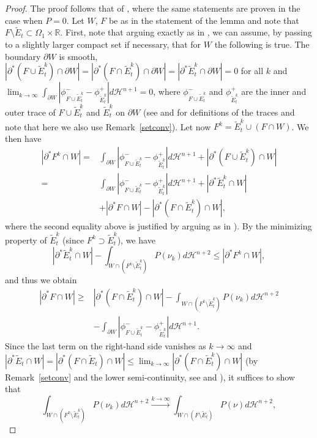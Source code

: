 \documentclass[11pt]{amsart}
\def\R{\mathbb{R}}
\def\H{\mathcal{H}}
\def\wt{\widetilde}
\begin{document}
\begin{proof} The proof follows that of \cite[Lemma 5.6, Corollary 5.7]{S08}, where the same statements are proven in the case when $P=0$. Let $W$, $F$ be as in the statement of the lemma and note that $F\setminus\wt E_t\subset\Omega_1\times\R$. First, note that arguing exactly as in \cite[Lemma 5.6]{S08}, we can assume, by passing to a slightly larger compact set if necessary, that for $W$  the following is true. The boundary  $\partial W$ is smooth, 
$|\partial^*(F\cup \wt E_t^k)\cap\partial W|=|\partial^*(F\cap \wt E_t^k)\cap\partial W|=|\partial^* \wt E_t^k\cap\partial W|=0$ for all $k$
 and $\lim_{k\to\infty}\int_{\partial W} |\phi^-_{F\cup \wt E_t^k}-\phi^+_{\wt E_t^k}|d\H^{n+1}= 0$,
where $\phi^-_{F\cup \wt E_t^k}$ and $\phi^+_{\wt E_t^k}$
are the inner and outer trace of ${F\cup \wt E_t^k}$ and  $\wt E_t^k$ on $\partial W$ (see \cite[Chapter 2]{Giu} and \cite[Section 2.4]{Alex} for definitions of the traces and note that here we also use Remark~\ref{setconv}). Let now $F^k= \wt E_t^k\cup (F\cap W)$. We  then have
\[\begin{split}|\partial^*F^k\cap W|=&\int_{\partial W} |\phi^-_{F\cup \wt E_t^k}-\phi^+_{\wt E_t^k}|d\H^{n+1}+|\partial^*(F\cup \wt E_t^k)\cap W|\\
=&\int_{\partial W} |\phi^-_{F\cup \wt E_t^k}-\phi^+_{\wt E_t^k}|d\H^{n+1}+ |\partial^* \wt E^k_t\cap W|\\
&+ |\partial^* F\cap W|-|\partial^*(F\cap \wt E_t^k)\cap W|,
\end{split}\]
where the second equality above is justified by  arguing as in \cite[(36) of proof Lemma~5.6]{S08}).
By the minimizing property of  $\wt E_t^k$ (since $F^k\supset \wt E_t^k$), we have
\[|\partial^* \wt E^k_t\cap W|-\int_{W\cap (F^k\setminus \wt E^k_t)} P(\nu_k)d\H^{n+2}\le |\partial^* F^k\cap W|,\]
and thus  we  obtain 
\[\begin{split}
 |\partial^* F\cap W|\ge &|\partial^*(F\cap \wt E_t^k)\cap W|- \int_{W\cap (F^k\setminus \wt E^k_t)} P(\nu_k)d\H^{n+2}\\
 &-\int_{\partial W} |\phi^-_{F\cup \wt E_t^k}-\phi^+_{\wt E_t^k}|d\H^{n+1}.
\end{split}\]
Since the last term on the right-hand side vanishes as $k\to \infty$ and $|\partial^* \wt E_t\cap W|=|\partial^*(F\cap \wt E_t)\cap W| \le \lim_{k\to\infty}|\partial^*(F\cap\wt E_t^k)\cap W|$ (by Remark~\ref{setconv} and the lower semi-continuity, see \cite[Theorem 1.9]{Giu} and \cite[Theorem 2.38]{Alex}), it suffices to show that
\[\int_{W\cap (F^k\setminus \wt E^k_t)} P(\nu_k)d\H^{n+2} \stackrel{k\to \infty}{\longrightarrow}\int_{W\cap (F\setminus \wt E_t)} P(\nu)d\H^{n+2}, \]

\end{proof}
\end{document}
